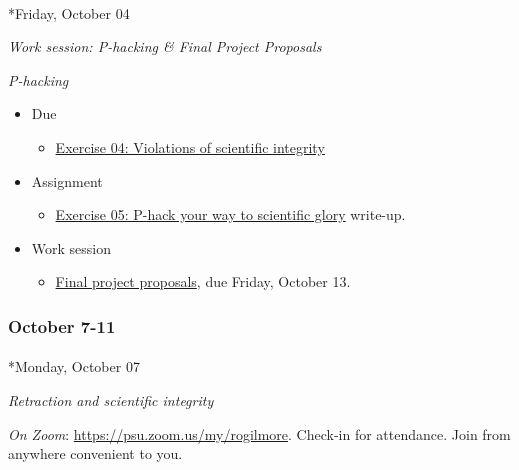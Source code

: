 \documentclass[
  letterpaper,
  DIV=11,
  numbers=noendperiod]{scrartcl}
\makeatletter
\let\oldparagraph\paragraph
\renewcommand{\paragraph}{
    \@ifstar
      \xxxParagraphStar
      \xxxParagraphNoStar
  }
\newcommand{\xxxParagraphStar}[1]{\oldparagraph*{#1}\mbox{}}
\newcommand{\xxxParagraphNoStar}[1]{\oldparagraph{#1}\mbox{}}
\providecommand{\tightlist}{%
  \setlength{\itemsep}{0pt}\setlength{\parskip}{0pt}}\usepackage{longtable,booktabs,array}
\makeatother
\begin{document}
\paragraph*{Friday, October 04}\label{friday-october-04}

\emph{Work session: P-hacking \& Final Project Proposals}

\emph{P-hacking}

\begin{itemize}
\tightlist
\item
  {Due}

  \begin{itemize}
  \tightlist
  \item
    \href{exercises/ex04-scientific-integrity.qmd}{Exercise 04:
    Violations of scientific integrity}
  \end{itemize}
\item
  {Assignment}

  \begin{itemize}
  \tightlist
  \item
    \href{exercises/ex05-p-hacking.qmd}{Exercise 05: P-hack your way to
    scientific glory} write-up.
  \end{itemize}
\item
  Work session

  \begin{itemize}
  \tightlist
  \item
    \href{exercises/final-project.qmd}{Final project proposals}, {due
    Friday, October 13}.
  \end{itemize}
\end{itemize}

\subsubsection*{October 7-11}\label{week-07}

\paragraph*{Monday, October 07}\label{monday-october-07}

\emph{Retraction and scientific integrity}

\emph{On Zoom}: \url{https://psu.zoom.us/my/rogilmore}. Check-in for
attendance. Join from anywhere convenient to you.
\end{document}

